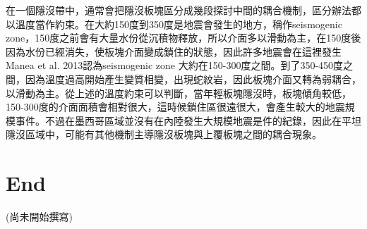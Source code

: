 在一個隱沒帶中，通常會把隱沒板塊區分成幾段探討中間的耦合機制，區分辦法都以溫度當作約束。在大約150度到350度是地震會發生的地方，稱作seismogenic zone，150度之前會有大量水份從沉積物釋放，所以介面多以滑動為主，在150度後因為水份已經消失，使板塊介面變成鎖住的狀態，因此許多地震會在這裡發生 Manea et al. 2013認為seismogenic zone 大約在150-300度之間。到了350-450度之間，因為溫度過高開始產生變質相變，出現蛇紋岩，因此板塊介面又轉為弱耦合，以滑動為主。從上述的溫度約束可以判斷，當年輕板塊隱沒時，板塊傾角較低，150-300度的介面面積會相對很大，這時候鎖住區很遠很大，會產生較大的地震規模事件。不過在墨西哥區域並沒有在內陸發生大規模地震是件的紀錄，因此在平坦隱沒區域中，可能有其他機制主導隱沒板塊與上覆板塊之間的耦合現象。

\section{End}

(尚未開始撰寫)